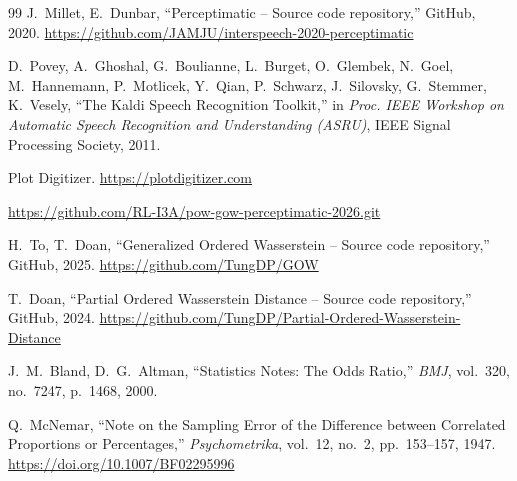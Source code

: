 \documentclass{article}
\begin{document}
\begin{thebibliography}{99}
J.~Millet, E.~Dunbar,
\enquote{Perceptimatic -- Source code repository,}
GitHub, 2020.
\url{https://github.com/JAMJU/interspeech-2020-perceptimatic}

D.~Povey, A.~Ghoshal, G.~Boulianne, L.~Burget, O.~Glembek, N.~Goel,
M.~Hannemann, P.~Motlicek, Y.~Qian, P.~Schwarz, J.~Silovsky,
G.~Stemmer, K.~Vesely,
\enquote{The Kaldi Speech Recognition Toolkit,}
in \textit{Proc. IEEE Workshop on Automatic Speech Recognition and
Understanding (ASRU)}, IEEE Signal Processing Society, 2011.

Plot Digitizer.
\url{https://plotdigitizer.com}

\url{https://github.com/RL-I3A/pow-gow-perceptimatic-2026.git}

H.~To, T.~Doan,
\enquote{Generalized Ordered Wasserstein -- Source code repository,}
GitHub, 2025.
\url{https://github.com/TungDP/GOW}

T.~Doan,
\enquote{Partial Ordered Wasserstein Distance -- Source code repository,}
GitHub, 2024.
\url{https://github.com/TungDP/Partial-Ordered-Wasserstein-Distance}

J.~M.~Bland, D.~G.~Altman,
\enquote{Statistics Notes: The Odds Ratio,}
\textit{BMJ}, vol.~320, no.~7247, p.~1468, 2000.

Q.~McNemar,
\enquote{Note on the Sampling Error of the Difference between Correlated
Proportions or Percentages,}
\textit{Psychometrika}, vol.~12, no.~2, pp.~153--157, 1947.
\url{https://doi.org/10.1007/BF02295996}

\end{thebibliography}
\end{document}
